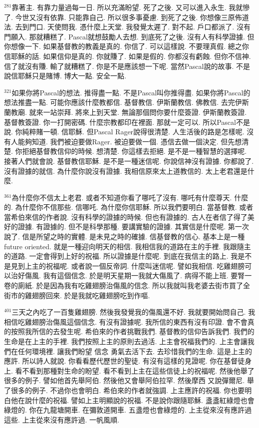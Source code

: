 \documentclass{book}
\begin{document}
$^{281}$靠著主.
有靠力量過每一日.
所以充滿盼望.
死了之後.
又可以進入永生.
我就慘了.
今世又沒有依靠.
只能靠自己.
所以很多事憂慮.
到死了之後.
你想像三原佈道法.
去到門口.
天使問我.
憑什麼上天堂.
我發覺太遲了.
對不起.
戶口都派了.
沒有門願入.
那就糟糕了.
Pascal就想鼓勵人去想.
到底死了之後.
沒有人有科學證據.
但你想像一下.
如果基督教的教義是真的.
你信了.
可以這樣說.
不要理真假.
總之你信耶穌的話.
如果信仰是真的.
你就賺了.
如果是假的.
你都沒有虧蝕.
但你不信神.
信了就沒有賺.
輸了就糟糕了.
你是不是應該想一下呢.
當然Pascal說的故事.
不是說信耶穌只是賭博.
博大一點.
安全一點.

$^{321}$如果你將Pascal的想法.
推得盡一點.
不是Pascal叫你推得盡.
如果你將Pascal的想法推盡一點.
可能你應該什麼教都信.
基督教信.
伊斯蘭教信.
佛教信.
去完伊斯蘭教廟.
就來一站崇拜.
將來上到天堂.
無論那個問你要什麼簽證.
伊斯蘭教簽證.
基督教簽證.
你一打開密碼.
什麼宗教都印在裡面.
那就一定可以.
所以Pascal不是說.
你純粹賭一頓.
信耶穌.
但Pascal Rager說得很清楚.
人生活後的路是怎樣呢.
沒有人能夠知道.
我們被迫要做Rager.
被迫要做一個.
憑信去做一個決定.
但先想清楚.
你拒絕基督教信仰的時候.
想清楚.
你這樣去拒絕.
是不是一種智慧的選擇呢.
接著人們就會說.
基督教信耶穌.
是不是一種迷信呢.
你說信神沒有證據.
你都說了.
沒有證據的就信.
為什麼你說沒有證據.
我相信原來太上道教信的.
太上老君還是什麼.

$^{361}$為什麼你不信太上老君.
或者不知道你看了哪吒了沒有.
哪吒有什麼尊天.
什麼的.
為什麼你不信那些.
信哪吒.
為什麼你信耶穌.
所以我們要明白.
當基督教.
或者當希伯來信的作者說.
沒有科學的證據的時候.
但也有證據的.
古人在者信了得了美好的證據.
有證據的.
但不是科學那種.
要講實驗的證據.
其實信是什麼呢.
第一次說了.
信是所望之時的實體.
是未見之時的確據.
信基督教的信心.
基本上是一種future oriented.
就是一種迎向明天的相信.
我相信我的道路在主的手裡.
我跟隨主的道路.
一定會得到上好的祝福.
所以證據是什麼呢.
到底在我信主的路上.
我是不是見到上主的祝福呢.
或者說一個反帝詞.
什麼叫迷信呢.
譬如我相信.
吃雞翅膀可以治好傷風.
我有這個信念.
於是明天星期一我就大傷風了.
病得不能上班.
要腎一卷的廁紙.
於是因為我有吃雞翅膀治傷風的信念.
所以我就叫我老婆去街市買了全街市的雞翅膀回來.
於是我就吃雞翅膀吃到作嘔.

$^{401}$三天之內吃了一百隻雞翅膀.
然後我發覺我的傷風還不好.
我就要開始問自己.
我相信吃雞翅膀治傷風這個信念.
有沒有證據呢.
我所信的東西有沒有印證.
會不會真的按照我所信的去發生呢.
希伯來的作者挑戰我們.
基督教的信仰告訴我們.
我們的生命是在上主的手裡.
我們按照上主的原則去過活.
上主會祝福我們的.
上主會讓我們在任何環境裡.
讓我們盼望 信念 勇氣去活下去.
去珍惜我們的生命.
這是上主的應許.
所以詩人就說.
你看看歷代歷世的聖徒.
有沒有這樣的見證呢.
你在基督徒身上.
看不看到那種對生命的盼望.
看不看到上主在這些信徒上的祝福呢.
然後他舉了很多的例子.
譬如他首先舉阿伯.
然後他又會舉阿伯拉罕.
然後摩西 又說彈爾尼.
舉了很多的例子.
不過你也會明白.
希伯來的作者就強調.
上主應許的祝福.
你也要明白他在說什麼的祝福.
譬如上主明顯說的祝福.
不是說你跟隨耶穌.
盞盞紅綠燈也會綠燈的.
你在九龍塘開車.
在彌敦道開車.
五盞燈也會綠燈的.
上主從來沒有應許過這些.
上主從來沒有應許過.
一帆風順.
\end{document}
